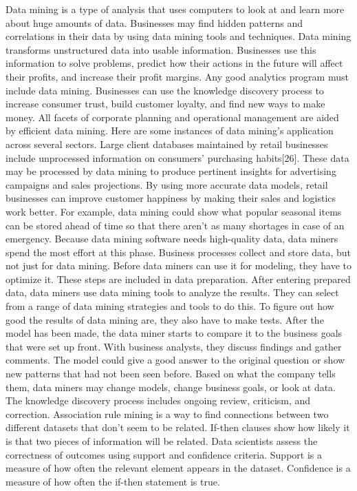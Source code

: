 \documentclass[journal]{IEEEtran}
\begin{document}
\par Data mining is a type of analysis that uses computers to look at and learn more about huge amounts of data. Businesses may find hidden patterns and correlations in their data by using data mining tools and techniques. Data mining transforms unstructured data into usable information. Businesses use this information to solve problems, predict how their actions in the future will affect their profits, and increase their profit margins. Any good analytics program must include data mining. Businesses can use the knowledge discovery process to increase consumer trust, build customer loyalty, and find new ways to make money. All facets of corporate planning and operational management are aided by efficient data mining. Here are some instances of data mining's application across several sectors. Large client databases maintained by retail businesses include unprocessed information on consumers' purchasing habits[26]. These data may be processed by data mining to produce pertinent insights for advertising campaigns and sales projections. By using more accurate data models, retail businesses can improve customer happiness by making their sales and logistics work better. For example, data mining could show what popular seasonal items can be stored ahead of time so that there aren't as many shortages in case of an emergency. Because data mining software needs high-quality data, data miners spend the most effort at this phase. Business processes collect and store data, but not just for data mining. Before data miners can use it for modeling, they have to optimize it. These steps are included in data preparation. After entering prepared data, data miners use data mining tools to analyze the results. They can select from a range of data mining strategies and tools to do this. To figure out how good the results of data mining are, they also have to make tests. After the model has been made, the data miner starts to compare it to the business goals that were set up front. With business analysts, they discuss findings and gather comments. The model could give a good answer to the original question or show new patterns that had not been seen before. Based on what the company tells them, data miners may change models, change business goals, or look at data. The knowledge discovery process includes ongoing review, criticism, and correction. Association rule mining is a way to find connections between two different datasets that don't seem to be related. If-then clauses show how likely it is that two pieces of information will be related. Data scientists assess the correctness of outcomes using support and confidence criteria. Support is a measure of how often the relevant element appears in the dataset. Confidence is a measure of how often the if-then statement is true.
\end{document}
